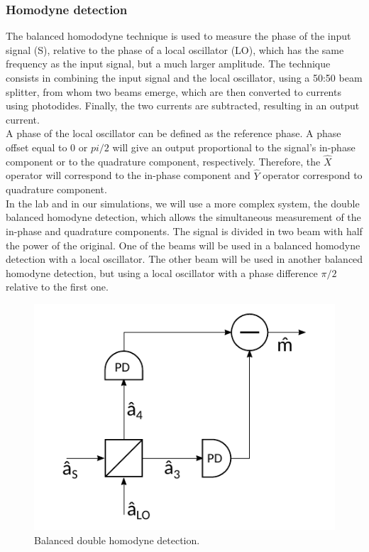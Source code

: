 \subsubsection{Homodyne detection}
The balanced homododyne technique is used to measure the phase of the input signal (S), relative to the phase of a local oscillator (LO), which has the same frequency as the input signal, but a much larger amplitude. The technique consists in combining the input signal and the local oscillator, using a 50:50 beam splitter, from whom two beams emerge, which are then converted to currents using photodides. Finally, the two currents are subtracted, resulting in an output current.\\
A phase of the local oscillator can be defined as the reference phase. A phase offset equal to $0$ or $pi/2$ will give an output proportional to the signal's in-phase component or to the quadrature component, respectively. Therefore, the $\hat{X}$ operator will correspond to the in-phase component and $\hat{Y}$ operator correspond to quadrature component.
\cite{fox2006}
\\
In the lab and in our simulations, we will use a more complex system, the double balanced homodyne detection, which allows the simultaneous measurement of the in-phase and quadrature components. The signal is divided in two beam with half the power of the original. One of the beams will be used in a balanced homodyne detection with a local oscillator. The other beam will be used in another balanced homodyne detection, but using a local oscillator with a phase difference $\pi/2$ relative to the first one.
%
\begin{figure}[H]
\label{fig:scheme_homodyne}
\centering
\includegraphics{./sdf/quantum_noise/figures/scheme_homodyne.pdf}
\caption{Balanced double homodyne detection.}
\end{figure}
%
%
%
